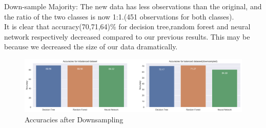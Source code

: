 \newline
Down-sample Majority:
The new data has less observations than the original, and the ratio of the two classes is now 1:1.(451 observations for both classes).\\
It is clear that accuracy(70,71,64)\% for decision tree,random forest and neural network respectively decreased compared to our previous results. This may be because we decreased the size of our data dramatically.
\begin{figure}[!ht]
 \centering
\includegraphics[width=6.1in]{assignment2/1-7-barcharts_dn.png}
\caption{\label{fig:fig5}Accuracies after Downsampling }
\end{figure}



